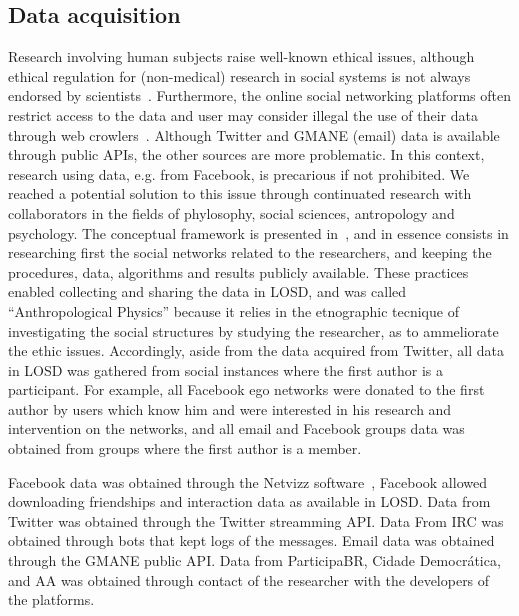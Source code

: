 \documentclass[data,datadescriptor,submit,moreauthors,pdftex]{Definitions/mdpi}
\begin{document}
\subsection{Data acquisition}\label{acq}
Research involving human subjects raise well-known ethical issues,
although ethical regulation for (non-medical) research in social systems is not always endorsed by scientists~\cite{eth}.
Furthermore, the online social networking platforms often restrict access
to the data and user may consider illegal the use of their data through web crowlers~\cite{ile1,ile2,ile3}.
Although Twitter and GMANE (email) data is available through public APIs,
the other sources are more problematic.
In this context, research using data, e.g. from Facebook, is precarious
if not prohibited.
We reached a potential solution to this issue through continuated research with
collaborators in the fields of phylosophy, social sciences, antropology and psychology.
The conceptual framework is presented in~\cite{antphy,antphy2}, and in essence
consists in researching first the social networks related to the researchers,
and keeping the procedures, data, algorithms and results publicly available.
These practices enabled collecting and sharing the data in LOSD,
and was called ``Anthropological Physics'' because it relies in the
etnographic tecnique of investigating the social structures
by studying the researcher, as to ammeliorate the ethic issues.
Accordingly, aside from the data acquired from Twitter, all data in LOSD
was gathered from social instances where the first author is a participant.
For example, all Facebook ego networks were donated to the first author by
users which know him and were interested in his research and intervention on the networks,
and all email and Facebook groups data was obtained from groups where the first author is a member.

Facebook data was obtained through the Netvizz software~\cite{netviz},
Facebook allowed downloading friendships and interaction data as available in LOSD.
Data from Twitter was obtained through the Twitter streamming API.
Data From IRC was obtained through bots that kept logs of the messages.
Email data was obtained through the GMANE public API.
Data from ParticipaBR, Cidade Democrática, and AA was obtained through contact
of the researcher with the developers of the platforms.
\end{document}
